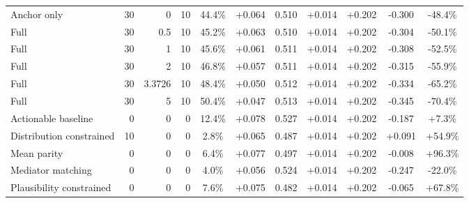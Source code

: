 \begin{table}[htbp]
\begin{tabular}{lrrrccccccc}
Anchor only & 30 & 0 & 10 & 44.4\% & +0.064 & 0.510 & +0.014 & +0.202 & -0.300 & -48.4\% \\
Full & 30 & 0.5 & 10 & 45.2\% & +0.063 & 0.510 & +0.014 & +0.202 & -0.304 & -50.1\% \\
Full & 30 & 1 & 10 & 45.6\% & +0.061 & 0.511 & +0.014 & +0.202 & -0.308 & -52.5\% \\
Full & 30 & 2 & 10 & 46.8\% & +0.057 & 0.511 & +0.014 & +0.202 & -0.315 & -55.9\% \\
Full & 30 & 3.3726 & 10 & 48.4\% & +0.050 & 0.512 & +0.014 & +0.202 & -0.334 & -65.2\% \\
Full & 30 & 5 & 10 & 50.4\% & +0.047 & 0.513 & +0.014 & +0.202 & -0.345 & -70.4\% \\
Actionable baseline & 0 & 0 & 0 & 12.4\% & +0.078 & 0.527 & +0.014 & +0.202 & -0.187 & +7.3\% \\
Distribution constrained & 10 & 0 & 0 & 2.8\% & +0.065 & 0.487 & +0.014 & +0.202 & +0.091 & +54.9\% \\
Mean parity & 0 & 0 & 0 & 6.4\% & +0.077 & 0.497 & +0.014 & +0.202 & -0.008 & +96.3\% \\
Mediator matching & 0 & 0 & 0 & 4.0\% & +0.056 & 0.524 & +0.014 & +0.202 & -0.247 & -22.0\% \\
Plausibility constrained & 0 & 0 & 0 & 7.6\% & +0.075 & 0.482 & +0.014 & +0.202 & -0.065 & +67.8\% \\
\bottomrule
\end{tabular}
\end{table}